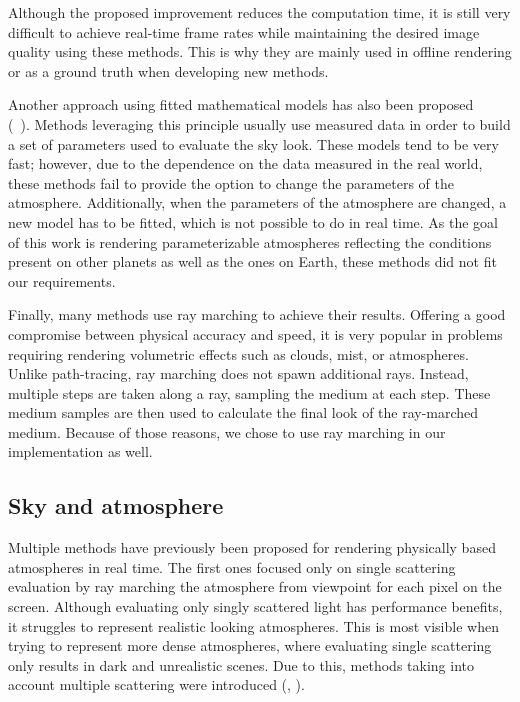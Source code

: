 \documentclass{ctuthesis}
\begin{document}
Although the proposed improvement reduces the computation time, it is still very difficult to achieve real-time
frame rates while maintaining the desired image quality using these methods. This is why 
they are mainly used in offline rendering or as a ground truth when developing new methods. 

Another approach using fitted mathematical models has also been proposed \\
(\cite{hosek2012analytic}~\cite{wilkie2021fitted}). Methods leveraging this 
principle usually use measured data in order to build a set of parameters used to evaluate the 
sky look. These models tend to be very fast; however, due to the dependence on the data measured
in the real world, these methods fail to provide the option to change the parameters of the atmosphere.
Additionally, when the parameters of the atmosphere are changed, a new model has to be fitted, which is
not possible to do in real time. As the goal of this work is rendering parameterizable atmospheres 
reflecting the conditions present on other planets as well as the ones on Earth, these methods 
did not fit our requirements.

Finally, many methods use ray marching to achieve their results. Offering a good compromise between 
physical accuracy and speed, it is very popular in problems requiring rendering volumetric effects such as clouds, mist,
or atmospheres. Unlike path-tracing, ray marching does not spawn additional rays. Instead, multiple steps are 
taken along a ray, sampling the medium at each step. These medium samples are then used to 
calculate the final look of the ray-marched medium. Because of those reasons, we chose to use ray marching
in our implementation as well. 

\subsection{Sky and atmosphere}

Multiple methods have previously been proposed for rendering physically based atmospheres in real time.
The first ones focused only on single scattering evaluation by ray marching the atmosphere from viewpoint
for each pixel on the screen. Although evaluating only singly scattered light has performance benefits,
it struggles to represent realistic looking atmospheres. This is most visible when trying to represent
more dense atmospheres, where evaluating single scattering only results in dark and unrealistic
scenes. Due to this, methods taking into account multiple scattering were introduced
(\cite{bruneton_neyret_2008}, \cite{yusov2014high}).
\end{document}

